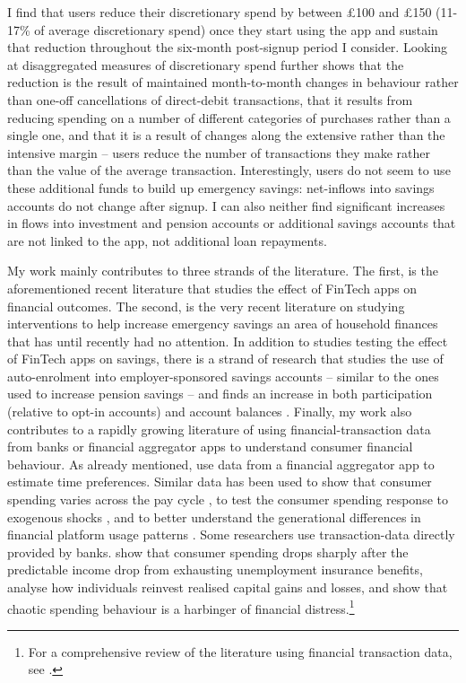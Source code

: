 I find that users reduce their discretionary spend by between \pounds100 and
\pounds150 (11-17\% of average discretionary spend) once they start using the
app and sustain that reduction throughout the six-month post-signup period I
consider. Looking at disaggregated measures of discretionary spend further
shows that the reduction is the result of maintained month-to-month changes in
behaviour rather than one-off cancellations of direct-debit transactions, that
it results from reducing spending on a number of different categories of
purchases rather than a single one, and that it is a result of changes along
the extensive rather than the intensive margin -- users reduce the number of
transactions they make rather than the value of the average transaction.
Interestingly, users do not seem to use these additional funds to build up
emergency savings: net-inflows into savings accounts do not change after
signup. I can also neither find significant increases in flows into investment
and pension accounts or additional savings accounts that are not linked to the
app, not additional loan repayments.

My work mainly contributes to three strands of the literature. The first, is
the aforementioned recent literature that studies the effect of FinTech apps on
financial outcomes. The second, is the very recent literature on studying
interventions to help increase emergency savings an area of household finances
that has until recently had no attention. In addition to studies testing the
effect of FinTech apps on savings, there is a strand of research that studies
the use of auto-enrolment into employer-sponsored savings accounts -- similar
to the ones used to increase pension savings \citep{thaler2004save,
choi2004better, choukhmane2019default} -- and finds an increase in both
participation (relative to opt-in accounts) and account balances
\citep{beshears2020building, berk2022automating}. Finally, my work also
contributes to a rapidly growing literature of using financial-transaction data
from banks or financial aggregator apps to understand consumer financial
behaviour. As already mentioned, \citet{kuchler2020sticking} use data from a
financial aggregator app to estimate time preferences. Similar data has been
used to show that consumer spending varies across the pay cycle
\citep{gelman2014harnessing,olafsson2018liquid}, to test the consumer spending
response to exogenous shocks \citep{baker2018debt,baugh2014disentangling}, and
to better understand the generational differences in financial platform usage
patterns \citep{carlin2019generational}. Some researchers use transaction-data
directly provided by banks. \citet{ganong2019consumer} show that consumer
spending drops sharply after the predictable income drop from exhausting
unemployment insurance benefits, \citet{meyer2018fully} analyse how individuals
reinvest realised capital gains and losses, and \citet{muggleton2020evidence}
show that chaotic spending behaviour is a harbinger of financial
distress.\footnote{For a comprehensive review of the literature using financial
transaction data, see \citet{baker2022household}.}

